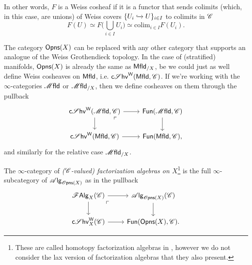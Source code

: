 \documentclass[../text.tex]{subfiles}
\begin{document}
\begin{remark}
    In other words, $F$ is a Weiss cosheaf if it is a functor that sends colimits (which, in this case, are unions) of Weiss covers $\{ U_i \xhookrightarrow{} U \}_{i \in I}$ to colimits in $\mathscr{C}$
    \begin{equation}
        F(U) \simeq F \bigg( \bigcup_{i \in I} U_i \bigg) \simeq \mathrm{colim}_{i \in I} F(U_i).
    \end{equation}
\end{remark}

\begin{remark}
    The category $\opens[r](X)$ can be replaced with any other category that supports an analogue of the Weiss Grothendieck topology. In the case of (stratified) manifolds, $\opens[r](X)$ is already the same as $\mfld[r]_{/X}$, be we could just as well define Weiss cosheaves on $\mfld[r]$, i.e. $\csheaves[W](\mfld[r], \catC)$. If we're working with the $\infty$-categories $\mfld$ or $\mfld_{/X}$, then we define cosheaves on them through the pullback
    \begin{equation}
        \begin{tikzcd}
            \csheaves[W] (\mfld, \catC) \arrow[dr, phantom, "\ulcorner", very near start] \arrow[r] \arrow[d] & \mathsf{Fun}(\mfld, \catC) \arrow[d] \\
            \csheaves[W] (\mfld[r], \catC) \arrow[r] & \mathsf{Fun}(\mfld[r], \catC),
        \end{tikzcd}
    \end{equation}
    and similarly for the relative case $\mfld_{/X}$.
\end{remark}

\begin{definition}
    The $\infty$-category of \emph{($\mathscr{C}$-valued) factorization algebras on $X$}\footnote{These are called homotopy factorization algebras in \cite{cg2016}, however we do not consider the lax version of factorization algebras that they also present.} is the full $\infty$-subcategory of $\alg{\opens[s](X)}$ as in the pullback
    \begin{equation}
        \begin{tikzcd}
            \falg_X (\catC) \arrow[dr, phantom, "\ulcorner", very near start] \arrow[r] \arrow[d] & \alg{\opens[s](X)}(\catC) \arrow[d] \\
            \csheaves[W]_X(\catC) \arrow[r] & \mathsf{Fun}(\opens[r](X), \catC).
        \end{tikzcd}
    \end{equation}
\end{definition}
\end{document}
